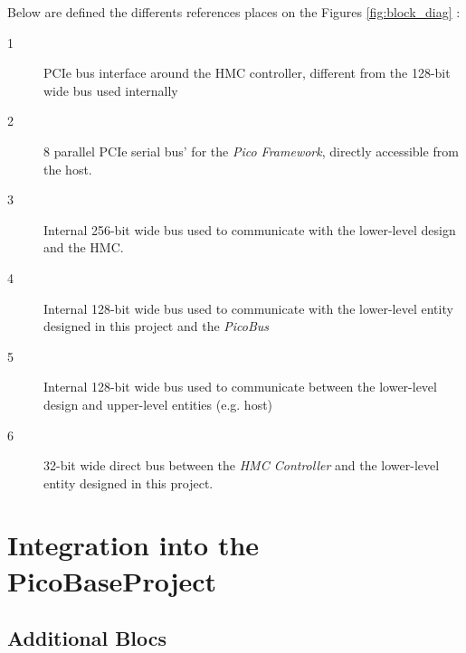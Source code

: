 \begin{minipage}[t]{0.35\textwidth}
Below are defined the differents references places on the Figures \ref{fig:block_diag} :
\begin{description}
\item [1] PCIe bus interface around the HMC controller, different from the \textrm{128-bit} wide bus used internally
\item [2] 8 parallel PCIe serial bus' for the \textsl{Pico Framework}, directly accessible from the host.
\item [3] Internal \textrm{256-bit} wide bus used to communicate with the lower-level design and the HMC.
\item [4] Internal \textrm{128-bit} wide bus used to communicate with the lower-level entity designed in this project and the \textsl{PicoBus}
\item [5] Internal \textrm{128-bit} wide bus used to communicate between the lower-level design and upper-level entities (e.g. host)
\item [6] \textrm{32-bit} wide direct bus between the \textsl{HMC Controller} and the lower-level entity designed in this project.
\end{description}
\end{minipage}

\section{Integration into the PicoBaseProject}


\subsection{Additional Blocs}



